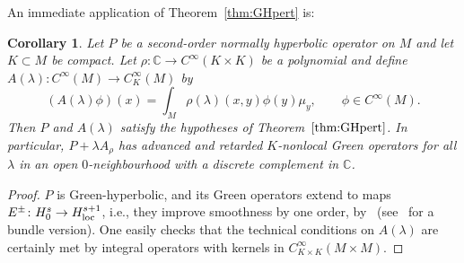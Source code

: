 \documentclass[pdftex]{sigma}
\numberwithin{equation}{section}
\newtheorem{Corollary}[Theorem]{Corollary}
\newcommand{\CC}{{\mathbb C}}
\newcommand{\loc}{{\rm loc}}
\begin{document}
 An immediate application of Theorem~\ref{thm:GHpert} is:
 \begin{Corollary}\label{cor:Moller}	
 	Let $P$ be a second-order normally hyperbolic operator on $M$ and let $K\subset M$ be compact.
 	Let $\rho\colon\CC\to C^\infty(K\times K)$ be a polynomial and define $A(\lambda)\colon C^\infty(M)\to C_K^\infty(M)$ by
 	\begin{equation*}
 		(A(\lambda) \phi)(x)=\int_M \rho(\lambda)(x,y)\phi(y)\mu_y, \qquad \phi\in C^\infty(M).
 	\end{equation*}
 	Then $P$ and $A(\lambda)$ satisfy the hypotheses of Theorem~$\ref{thm:GHpert}$. In particular, $P+\lambda A_\rho$ has advanced and retarded $K$-nonlocal Green operators for all $\lambda$ in an open $0$-neighbourhood with a discrete complement in $\CC$.
 \end{Corollary}
 \begin{proof}
 	$P$ is Green-hyperbolic, and its
 	Green operators extend to maps $E^\pm\colon H^s_0\to H^{s+1}_\loc$, i.e., they improve smoothness by one order, by~\cite[Theorem 6.5.3]{DuiHoer_FIOii:1972} (see~\cite{IslamStrohmaier:2020} for a bundle version).
 	One easily checks that the technical conditions on $A(\lambda)$ are certainly met by integral operators with kernels in $C^\infty_{K\times K}(M\times M)$.
 \end{proof}
\end{document}
